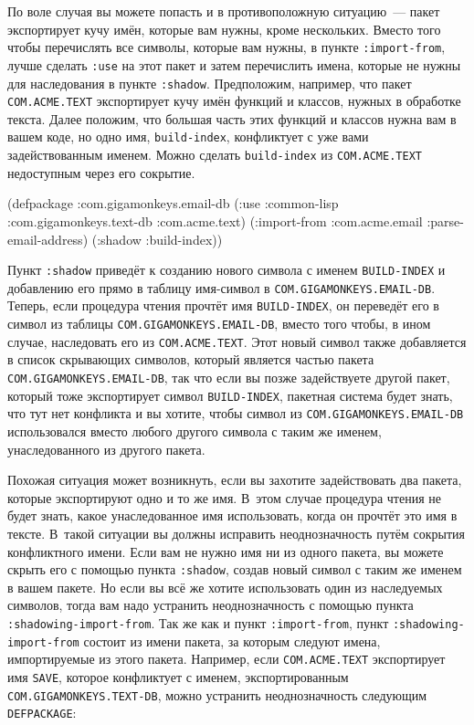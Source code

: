 По воле случая вы можете попасть и в противоположную ситуацию~--- пакет экспортирует кучу
имён, которые вам нужны, кроме нескольких. Вместо того чтобы перечислять все символы,
которые вам нужны, в пункте \lstinline{:import-from}, лучше сделать \lstinline{:use} на этот пакет и
затем перечислить имена, которые не нужны для наследования в пункте
\lstinline{:shadow}. Предположим, например, что пакет \lstinline{COM.ACME.TEXT} экспортирует кучу
имён функций и классов, нужных в обработке текста. Далее положим, что большая часть этих
функций и классов нужна вам в вашем коде, но одно имя, \lstinline{build-index}, конфликтует с
уже вами задействованным именем.  Можно сделать \lstinline{build-index} из \lstinline{COM.ACME.TEXT}
недоступным через его сокрытие.

\begin{myverb}
(defpackage :com.gigamonkeys.email-db
  (:use
   :common-lisp
   :com.gigamonkeys.text-db
   :com.acme.text)
  (:import-from :com.acme.email :parse-email-address)
  (:shadow :build-index))
\end{myverb}

Пункт \lstinline{:shadow} приведёт к созданию нового символа с именем \lstinline{BUILD-INDEX} и
добавлению его прямо в таблицу имя-символ в \lstinline{COM.GIGAMONKEYS.EMAIL-DB}. Теперь, если
процедура чтения прочтёт имя \lstinline{BUILD-INDEX}, он переведёт его в символ из таблицы
\lstinline{COM.GIGAMONKEYS.EMAIL-DB}, вместо того чтобы, в ином случае, наследовать его из
\lstinline{COM.ACME.TEXT}. Этот новый символ также добавляется в список скрывающих символов,
который является частью пакета \lstinline{COM.GIGAMONKEYS.EMAIL-DB}, так что если вы позже
задействуете другой пакет, который тоже экспортирует символ \lstinline{BUILD-INDEX}, пакетная
система будет знать, что тут нет конфликта и вы хотите, чтобы символ из
\lstinline{COM.GIGAMONKEYS.EMAIL-DB} использовался вместо любого другого символа с таким же
именем, унаследованного из другого пакета.

Похожая ситуация может возникнуть, если вы захотите задействовать два пакета, которые
экспортируют одно и то же имя. В~этом случае процедура чтения не будет знать, какое
унаследованное имя использовать, когда он прочтёт это имя в тексте. В~такой ситуации вы
должны исправить неоднозначность путём сокрытия конфликтного имени. Если вам не нужно имя
ни из одного пакета, вы можете скрыть его с по\-мощью пункта \lstinline{:shadow}, создав новый
символ с таким же именем в вашем пакете. Но если вы всё же хотите использовать один из
наследуемых символов, тогда вам надо устранить неоднозначность с помощью пункта
\lstinline{:shadowing-import-from}. Так же как и пункт \lstinline{:import-from}, пункт
\lstinline{:shadowing-import-from} состоит из имени пакета, за которым следуют имена,
импортируемые из этого пакета. Например, если \lstinline{COM.ACME.TEXT} экспортирует имя
\lstinline{SAVE}, которое конфликтует с именем, экспортированным
\lstinline{COM.GIGAMONKEYS.TEXT-DB}, можно устранить неоднозначность следующим
\lstinline{DEFPACKAGE}:

